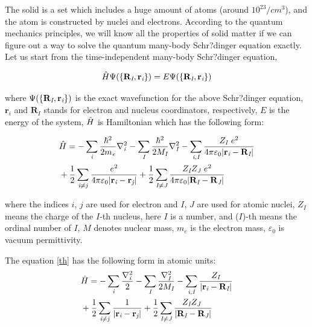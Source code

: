 \documentclass[a4paper, 12pt, titlepage,oneside,drop]{kthesis}
\begin{document}
\noindent The solid is a set which includes a huge amount of atoms (around $10^{23}/cm^3$), and the atom is constructed by nuclei and electrons. 
According to the quantum mechanics principles, we will know all the properties of solid matter if we can figure out a way to solve 
the quantum many-body Schr?dinger equation exactly. Let us start from the time-independent many-body Schr?dinger equation,

 
\begin{equation}\label{ssth}
 {\hat{H}} {\Psi(\{\textbf{R}_\textit{I}, \textbf{r}_\textit{i} \})} = {E} {\Psi(\{\textbf{R}_\textit{I}, \textbf{r}_\textit{i} \})}
\end{equation}

\noindent where $\Psi(\{\textbf{R}_\textit{I}, \textbf{r}_\textit{i} \})$  is the exact wavefunction for the above Schr?dinger equation, $\textbf{r}_\textit{i}$ and $\textbf{R}_\textit{I}$  stands for electron and nucleus coordinators,
respectively, $E$ is the energy of the system, $\hat{H}$ is Hamiltonian which has the following form:

\begin{equation}\label{th}\begin{split}
&\hath = - \sumi<i> {\frac{\hbar^{2}}{2 m_\textit{e}}}   \nablai2<i> - \sumi<I> {\frac{\hbar^{2}}{2 M_\textit{I}}} \nablai2<I>  - \sumij<i><I> \frac{Z_\textit{I}\ e^2}{4 \pi \varepsilon_0 |\textbf{r}_\textit{i}-\textbf{R}_\textit{I}|} \\
& + \frac{1}{2} \suminj<i><j> \frac{ e^2}{4 \pi \varepsilon_0 |\textbf{r}_\textit{i}-\textbf{r}_\textit{j}|} + \frac{1}{2} \suminj<I><J> \frac{Z_\textit{I} Z_\textit{J}\  e^2}{4 \pi \varepsilon_0 |\textbf{R}_\textit{I}-\textbf{R}_\textit{J}|}
\end{split}\end{equation}


\noindent where the indices $\textit{i}$, $\textit{j}$ are used for electron and $\textit{I}$, $\textit{J}$ are used for atomic nuclei, $Z_\textit{I}$ means the charge of the $\textit{I}$-th nucleus,
here  $\textit{I}$ is a number, and ($\textit{I}$)-th means the ordinal number of $\textit{I}$, $\textit{M}$ denotes nuclear mass, $m_e$ is the electron mass, $\varepsilon_0$ is vacuum permittivity.

\noindent The equation \ref{th} has the following form in atomic units:
\
\begin{equation}\label{sth}\begin{split}
&\hath = - \sumi<i>   \frac{{{\nabla}_{\textit{i}}^{2}}}{2} - \sumi<I> \frac{{{\nabla}_{\textit{I}}^{2}}}{2 M_\textit{I}}  - \sumij<i><I> \frac{Z_\textit{I}}{|\textbf{r}_\textit{i}-\textbf{R}_\textit{I}|} \\
& + \frac{1}{2} \suminj<i><j> \frac{1}{ |\textbf{r}_\textit{i}-\textbf{r}_\textit{j}|} + \frac{1}{2} \suminj<I><J> \frac{Z_\textit{I} Z_\textit{J}\ }{|\textbf{R}_\textit{I}-\textbf{R}_\textit{J}|}
\end{split}\end{equation}
\end{document}
